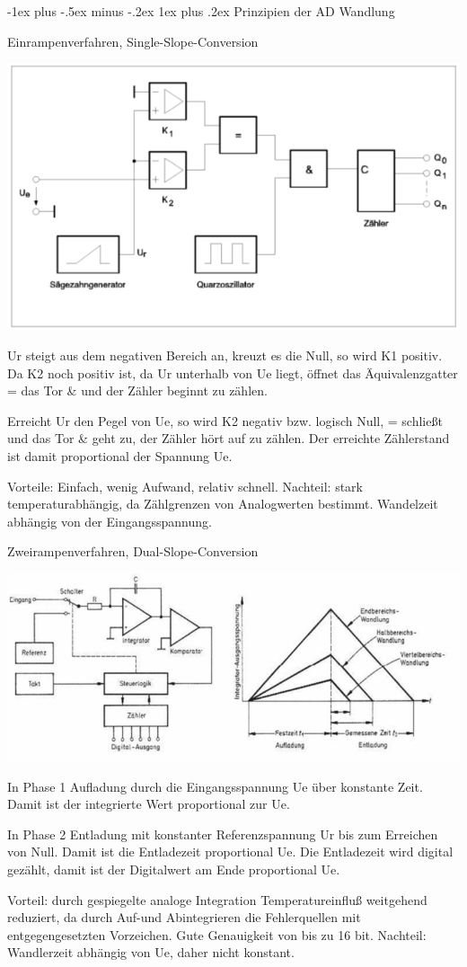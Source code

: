 \documentclass[a4paper]{article}
\makeatletter
\renewcommand{\subsubsection}{\@startsection{subsubsection}{3}{0mm}%
 {-1ex plus -.5ex minus -.2ex}%
 {1ex plus .2ex}%
 {\normalfont\small\bfseries}}
\makeatother
\begin{document}
\begin{multicols}{3}
  \subsubsection{Prinzipien der AD Wandlung}\label{prinzipien-der-ad-wandlung}

  Einrampenverfahren, Single-Slope-Conversion

  \begin{itemize*}
    \item \includegraphics[width=.5\linewidth]{Assets/Biosignalverarbeitung-Einrampenverfahren.png}
    \item Ur steigt aus dem negativen Bereich an, kreuzt es die Null, so wird K1 positiv. Da K2 noch positiv ist, da Ur unterhalb von Ue liegt, öffnet das Äquivalenzgatter = das Tor \& und der Zähler beginnt zu zählen.
    \item Erreicht Ur den Pegel von Ue, so wird K2 negativ bzw. logisch Null, = schließt und das Tor \& geht zu, der Zähler hört auf zu zählen. Der erreichte Zählerstand ist damit proportional der Spannung Ue.
    \item Vorteile: Einfach, wenig Aufwand, relativ schnell. Nachteil: stark temperaturabhängig, da Zählgrenzen von Analogwerten bestimmt. Wandelzeit abhängig von der Eingangsspannung.
  \end{itemize*}

  Zweirampenverfahren, Dual-Slope-Conversion

  \begin{itemize*}
    \item \includegraphics[width=.5\linewidth]{Assets/Biosignalverarbeitung-Zweirampenverfahren.png}
    \item In Phase 1 Aufladung durch die Eingangsspannung Ue über konstante Zeit. Damit ist der integrierte Wert proportional zur Ue.
    \item In Phase 2 Entladung mit konstanter Referenzspannung Ur bis zum Erreichen von Null. Damit ist die Entladezeit proportional Ue. Die Entladezeit wird digital gezählt, damit ist der Digitalwert am Ende proportional Ue.
    \item Vorteil: durch gespiegelte analoge Integration Temperatureinfluß weitgehend reduziert, da durch Auf-und Abintegrieren die Fehlerquellen mit entgegengesetzten Vorzeichen. Gute Genauigkeit von bis zu 16 bit. Nachteil: Wandlerzeit abhängig von Ue, daher nicht konstant.
  \end{itemize*}


\end{multicols}
\end{document}
